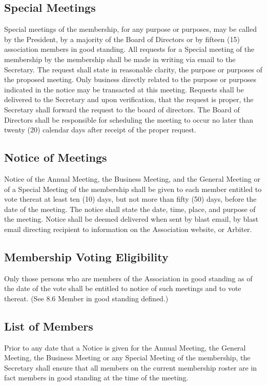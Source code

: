 \documentclass[letterpaper,11pt]{article}
\begin{document}
\subsection{Special Meetings}
Special meetings of the membership, for any purpose or purposes, may be called by the President, by a majority of the Board of Directors or by fifteen (15) association members in good standing. All requests for a Special meeting of the membership by the membership shall be made in writing via email to the Secretary. The request shall state in reasonable clarity, the purpose or purposes of the proposed meeting. Only business directly related to the purpose or purposes indicated in the notice may be transacted at this meeting. Requests shall be delivered to the Secretary and upon verification, that the request is proper, the Secretary shall forward the request to the board of directors. The Board of Directors shall be responsible for scheduling the meeting to occur no later than twenty (20) calendar days after receipt of the proper request.
\subsection{Notice of Meetings}
Notice of the Annual Meeting, the Business Meeting, and the General Meeting or of a Special Meeting of the membership shall be given to each member entitled to vote thereat at least ten (10) days, but not more than fifty (50) days, before the date of the meeting. The notice shall state the date, time, place, and purpose of the meeting. Notice shall be deemed delivered when sent by blast email, by blast email directing recipient to information on the Association website, or Arbiter.
\subsection{Membership Voting Eligibility}
Only those persons who are members of the Association in good standing as of the date of the vote shall be entitled to notice of such meetings and to vote thereat. (See 8.6 Member in good standing defined.)
\subsection{List of Members}
Prior to any date that a Notice is given for the Annual Meeting, the General Meeting, the Business Meeting or any Special Meeting of the membership, the Secretary shall ensure that all members on the current membership roster are in fact members in good standing at the time of the meeting.
\end{document}
